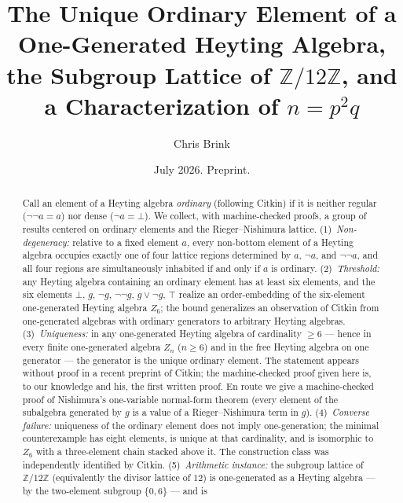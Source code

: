 ﻿\documentclass[11pt]{amsart}
\theoremstyle{plain}
\theoremstyle{definition}
\theoremstyle{remark}
\newcommand{\ZZ}{\mathbb{Z}}
\newcommand{\Znn}[1]{Z_{#1}}
\begin{document}
\title[Unique ordinary elements, $\ZZ/12\ZZ$, and $n = p^2 q$]{The Unique
Ordinary Element of a One-Generated Heyting Algebra, the Subgroup Lattice of
$\ZZ/12\ZZ$, and a Characterization of $n = p^2 q$}

\author{Chris Brink}
\address{Independent researcher}

\date{July 2026. Preprint.}

\begin{abstract}
Call an element of a Heyting algebra \emph{ordinary} (following Citkin) if it
is neither regular ($\neg\neg a = a$) nor dense ($\neg a = \bot$). We collect,
with machine-checked proofs, a group of results centered on ordinary elements
and the Rieger--Nishimura lattice. (1)~\emph{Non-degeneracy:} relative to a
fixed element $a$, every non-bottom element of a Heyting algebra occupies
exactly one of four lattice regions determined by $a$, $\neg a$, and
$\neg\neg a$, and all four regions are simultaneously inhabited if and only if
$a$ is ordinary. (2)~\emph{Threshold:} any Heyting algebra containing an
ordinary element has at least six elements, and the six elements $\bot$, $g$,
$\neg g$, $\neg\neg g$, $g \vee \neg g$, $\top$ realize an order-embedding of
the six-element one-generated Heyting algebra $\Znn{6}$; the bound generalizes
an observation of Citkin from one-generated algebras with ordinary generators
to arbitrary Heyting algebras. (3)~\emph{Uniqueness:} in any one-generated
Heyting algebra of cardinality $\ge 6$ --- hence in every finite one-generated
algebra $\Znn{n}$ ($n \ge 6$) and in the free Heyting algebra on one generator
--- the generator is the unique ordinary element. The statement appears
without proof in a recent preprint of Citkin; the machine-checked proof given
here is, to our knowledge and his, the first written proof. En route we give a
machine-checked proof of Nishimura's one-variable normal-form theorem (every
element of the subalgebra generated by $g$ is a value of a Rieger--Nishimura
term in $g$). (4)~\emph{Converse failure:} uniqueness of the ordinary element
does not imply one-generation; the minimal counterexample has eight elements,
is unique at that cardinality, and is isomorphic to $\Znn{6}$ with a
three-element chain stacked above it. The construction class was independently
identified by Citkin. (5)~\emph{Arithmetic instance:} the subgroup lattice of
$\ZZ/12\ZZ$ (equivalently the divisor lattice of $12$) is one-generated as a
Heyting algebra --- by the two-element subgroup $\{0, 6\}$ --- and is

\end{abstract}
\end{document}
